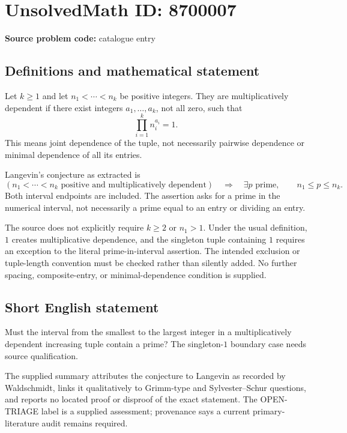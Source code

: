 \documentclass[11pt]{article}
\begin{document}
\section*{UnsolvedMath ID: 8700007}
\textbf{Source problem code:} catalogue entry
\subsection{Definitions and mathematical statement}
Let $k\ge1$ and let $n_1<\cdots<n_k$ be positive integers. They are multiplicatively dependent if there exist integers $a_1,\ldots,a_k$, not all zero, such that
\[
 \prod_{i=1}^k n_i^{a_i}=1.
\]
This means joint dependence of the tuple, not necessarily pairwise dependence or minimal dependence of all its entries.

Langevin's conjecture as extracted is
\[
 \left(n_1<\cdots<n_k\text{ positive and multiplicatively dependent}\right)
 \quad\Longrightarrow\quad
 \exists p\text{ prime},\qquad n_1\le p\le n_k.
\]
Both interval endpoints are included. The assertion asks for a prime in the numerical interval, not necessarily a prime equal to an entry or dividing an entry.

The source does not explicitly require $k\ge2$ or $n_1>1$. Under the usual definition, $1$ creates multiplicative dependence, and the singleton tuple containing $1$ requires an exception to the literal prime-in-interval assertion. The intended exclusion or tuple-length convention must be checked rather than silently added. No further spacing, composite-entry, or minimal-dependence condition is supplied.
\subsection{Short English statement}
Must the interval from the smallest to the largest integer in a multiplicatively dependent increasing tuple contain a prime? The singleton-$1$ boundary case needs source qualification.

The supplied summary attributes the conjecture to Langevin as recorded by Waldschmidt, links it qualitatively to Grimm-type and Sylvester--Schur questions, and reports no located proof or disproof of the exact statement. The OPEN-TRIAGE label is a supplied assessment; provenance says a current primary-literature audit remains required.
\end{document}
